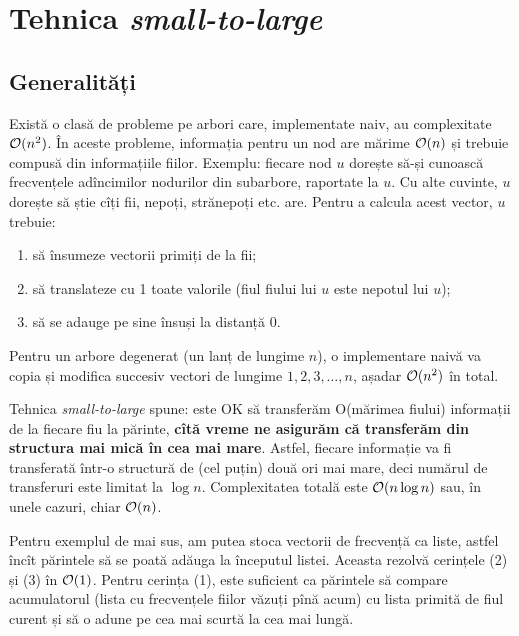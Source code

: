 \documentclass[../main.tex]{subfiles}
\begin{document}
\chapter{Tehnica \textit{small-to-large}}
\label{chapter:small-to-large}

\section{Generalități}

Există o clasă de probleme pe arbori care, implementate naiv, au complexitate $\mathcal{O}(n^2)$.  În aceste probleme, informația pentru un nod are mărime $\mathcal{O}(n)$ și trebuie compusă din informațiile fiilor. Exemplu: fiecare nod $u$ dorește să-și cunoască frecvențele adîncimilor nodurilor din subarbore, raportate la $u$. Cu alte cuvinte, $u$ dorește să știe cîți fii, nepoți, strănepoți etc. are. Pentru a calcula acest vector, $u$ trebuie:

\begin{enumerate}
  \item să însumeze vectorii primiți de la fii;
  \item să translateze cu 1 toate valorile (fiul fiului lui $u$ este nepotul lui $u$);
  \item să se adauge pe sine însuși la distanță 0.
\end{enumerate}

Pentru un arbore degenerat (un lanț de lungime $n$), o implementare naivă va copia și modifica succesiv vectori de lungime $1, 2, 3, \dots, n$, așadar $\mathcal{O}(n^2)$ în total.

Tehnica \textit{small-to-large} spune: este OK să transferăm O(mărimea fiului) informații de la fiecare fiu la părinte, \textbf{cîtă vreme ne asigurăm că transferăm din structura mai mică în cea mai mare}. Astfel, fiecare informație va fi transferată într-o structură de (cel puțin) două ori mai mare, deci numărul de transferuri este limitat la $\log n$. Complexitatea totală este $\mathcal{O}(n \log n)$ sau, în unele cazuri, chiar $\mathcal{O}(n)$.

Pentru exemplul de mai sus, am putea stoca vectorii de frecvență ca liste, astfel încît părintele să se poată adăuga la începutul listei. Aceasta rezolvă cerințele (2) și (3) în $\mathcal{O}(1)$. Pentru cerința (1), este suficient ca părintele să compare acumulatorul (lista cu frecvențele fiilor văzuți pînă acum) cu lista primită de fiul curent și să o adune pe cea mai scurtă la cea mai lungă.
\end{document}
